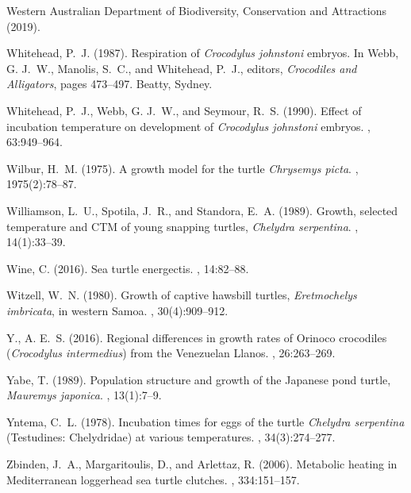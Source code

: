 \documentclass{article}
\begin{document}
\begin{thebibliography}{}
{Western Australian Department of Biodiversity, Conservation and Attractions}
  (2019).

Whitehead, P.~J. (1987).
\newblock Respiration of \emph{Crocodylus johnstoni} embryos.
\newblock In Webb, G. J.~W., Manolis, S.~C., and Whitehead, P.~J., editors,
  {\em Crocodiles and Alligators}, pages 473--497. Beatty, Sydney.

Whitehead, P.~J., Webb, G. J.~W., and Seymour, R.~S. (1990).
\newblock Effect of incubation temperature on development of \emph{Crocodylus
  johnstoni} embryos.
, 63:949--964.

Wilbur, H.~M. (1975).
\newblock A growth model for the turtle \emph{Chrysemys picta}.
, 1975(2):78--87.

Williamson, L.~U., Spotila, J.~R., and Standora, E.~A. (1989).
\newblock Growth, selected temperature and {C}{T}{M} of young snapping turtles,
  \emph{Chelydra serpentina}.
, 14(1):33--39.

Wine, C. (2016).
\newblock Sea turtle energectis.
, 14:82--88.

Witzell, W.~N. (1980).
\newblock Growth of captive hawsbill turtles, \emph{Eretmochelys imbricata}, in
  western {S}amoa.
, 30(4):909--912.

Y., A. E.~S. (2016).
\newblock Regional differences in growth rates of {O}rinoco crocodiles
  (\emph{Crocodylus intermedius}) from the {V}enezuelan {L}lanos.
, 26:263–269.

Yabe, T. (1989).
\newblock Population structure and growth of the {J}apanese pond turtle,
  \emph{Mauremys japonica}.
, 13(1):7--9.

Yntema, C.~L. (1978).
\newblock Incubation times for eggs of the turtle \emph{Chelydra serpentina}
  ({T}estudines: {C}helydridae) at various temperatures.
, 34(3):274--277.

Zbinden, J.~A., Margaritoulis, D., and Arlettaz, R. (2006).
\newblock Metabolic heating in {M}editerranean loggerhead sea turtle clutches.
,
  334:151--157.


\end{thebibliography}
\end{document}
